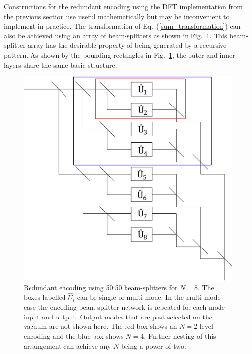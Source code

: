\documentclass[aps,pra,twocolumn,superscriptaddress,numerical,floatfix]{revtex4-1}
\begin{document}
Constructions for the redundant encoding using the DFT implementation from the previous section use useful mathematically but may be inconvenient to implement in practice.  The transformation of Eq.~(\ref{sum_transformation}) can also be achieved using an array of beam-splitters as shown in Fig.~\ref{fig:gen system}.  This beam-splitter array has the desirable property of being generated by a recursive pattern.  As shown by the bounding rectangles in Fig.~\ref{fig:gen system}, the outer and inner layers share the same basic structure. 
%
\begin{figure}[tbh]
	\includegraphics[width=\columnwidth]{unitaries.pdf}
	\caption{\label{fig:gen system}Redundant encoding using 50:50 beam-splitters for $N=8$. The boxes labelled $\hat{U}_i$ can be single or multi-mode.  In the multi-mode case the encoding beam-splitter network is repeated for each mode input and output. Output modes that are post-selected on the vacuum are not shown here. The red box shows an $N=2$ level encoding and the blue box shows $N=4$.  Further nesting of this arrangement can achieve any $N$ being a power of two.}
\end{figure}
	
	
\end{document}
